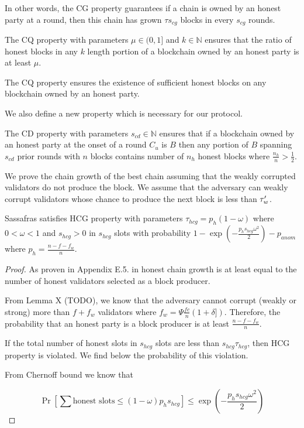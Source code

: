 In other words, the CG property guarantees if a chain is owned by an honest party at a round, then this chain has grown $ \tau s_{cg}$ blocks in every $ s_{cg} $ rounds. 

\begin{definition}\label{def:cq}
	The CQ property with parameters $ \mu \in (0,1]  $ and $ k \in \mathbb{N} $ ensures that the ratio of honest blocks in any $ k $ length portion of a blockchain owned by an honest party is at least $ \mu $.
\end{definition} 

The CQ property ensures the existence of sufficient honest blocks on  any blockchain owned by an honest party.

We also define a new property which is necessary for our protocol.
\begin{definition}
	\label{def:cd}
	The CD property with parameters $s_{cd} \in \mathbb{N}$ ensures that  if a blockchain owned by an honest party at the onset of a round $ C_u $ is $ B $ then any portion of  $B$ spanning $s_{cd}$ prior rounds with $n$ blocks  contains  number of $n_h$ honest blocks  where $\frac{n_h}{n}> \frac{1}{2}$.
\end{definition}


We prove the chain growth of the best chain assuming that the weakly corrupted validators do not produce the block. We assume that the adversary can weakly corrupt validators whose chance to produce the next block is less than $ \tau_w' $.


\begin{theorem}
	Sassafras satisfies HCG property with parameters $\tau_{hcg} = p_h(1-\omega)$ where $0 < \omega < 1$ and $s_{hcg} > 0$ in $s_{hcg}$ slots  with probability $1-\exp(-\frac{ p_h s_{hcg} \omega^2}{2}) - p_{anom}$ where $ p_h = \frac{n - f - f_w}{n} $.
\end{theorem}
\begin{proof}
	As proven in  Appendix E.5. in \cite{genesis} honest chain growth is at least equal to the number of honest validators selected as a block producer.
	
	From Lemma X (TODO), we know that the adversary cannot corrupt (weakly or strong) more than $f + f_w $ validators where $ f_w  =  \Psi\frac{fc}{n}(1+\delta])$.
	Therefore, the probability that an honest party is a block producer is at least $ \frac{n - f - f_w}{n} $.
	
	If the total number of honest slots in $ s_{hcg} $ slots are less than  $s_{hcg}\tau_{hcg}$, then HCG property is violated. 
	We find below the probability of this violation. 
	
	From Chernoff bound we know that
	
	$$\Pr[\sum \text{honest slots} \leq  (1-\omega) p_h s_{hcg}] \leq \exp(-\frac{p_h s_{hcg} \omega^2}{2})$$
	
\end{proof}
